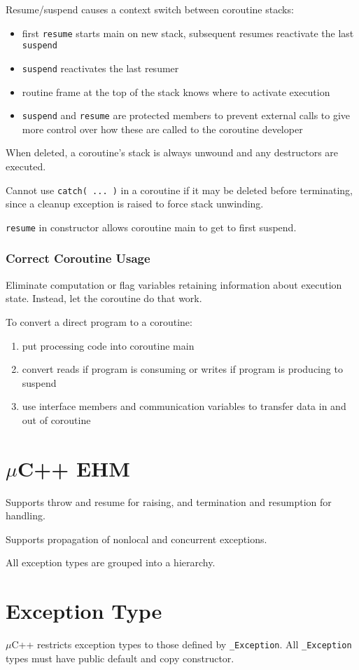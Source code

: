 \documentclass[11pt]{article}
\begin{document}
Resume/suspend causes a context switch between coroutine stacks:
\begin{itemize}
\item first \texttt{resume} starts main on new stack, subsequent resumes reactivate the last \texttt{suspend}
\item \texttt{suspend} reactivates the last resumer
\item routine frame at the top of the stack knows where to activate execution
\item \texttt{suspend} and \texttt{resume} are protected members to prevent external calls to give more control over
how these are called to the coroutine developer
\end{itemize}

When deleted, a coroutine's stack is always unwound and any destructors are executed.

Cannot use \texttt{catch( ... )} in a coroutine if it may be deleted before terminating, since a cleanup
exception is raised to force stack unwinding.

\texttt{resume} in constructor allows coroutine main to get to first suspend.
\subsubsection{Correct Coroutine Usage}
\label{sec:org2c3e00d}
Eliminate computation or flag variables retaining information about execution state.
Instead, let the coroutine do that work.

To convert a direct program to a coroutine:
\begin{enumerate}
\item put processing code into coroutine main
\item convert reads if program is consuming or writes if program is producing to suspend
\item use interface members and communication variables to transfer data in and out of coroutine
\end{enumerate}
\section{\(\mu\)C++ EHM}
\label{sec:orgec67700}
Supports throw and resume for raising, and termination and resumption for handling.

Supports propagation of nonlocal and concurrent exceptions.

All exception types are grouped into a hierarchy.
\section{Exception Type}
\label{sec:org160477f}
\(\mu\)C++ restricts exception types to those defined by \texttt{\_Exception}.
All \texttt{\_Exception} types must have public default and copy constructor.
\end{document}
